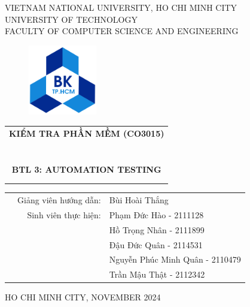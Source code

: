 \documentclass[a4paper, 12pt]{article}
\begin{document}
\begin{titlepage}
\begin{center}
VIETNAM NATIONAL UNIVERSITY, HO CHI MINH CITY \\
UNIVERSITY OF TECHNOLOGY \\
FACULTY OF COMPUTER SCIENCE AND ENGINEERING
\end{center}
\vspace{1cm}

\begin{figure}[h!]
\begin{center}
\includegraphics[width=3cm]{hcmut.png}
\end{center}
\end{figure}

\vspace{1cm}


\begin{center}
\begin{tabular}{c}
\multicolumn{1}{l}{\textbf{{\Large KIỂM TRA PHẦN MỀM (CO3015)}}}\\

~~\\
\hline
\\
\\
\textbf{{\Huge BTL 3: AUTOMATION TESTING}}\\
\\

\\
\hline
\end{tabular}
\end{center}

\vspace{3cm}

\begin{table}[h]
\begin{tabular}{rrl}
\hspace{3 cm} & Giảng viên hướng dẫn: & Bùi Hoài Thắng\\

& Sinh viên thực hiện:
& Phạm Đức Hào - 2111128\\
&& Hồ Trọng Nhân - 2111899\\
&& Đậu Đức Quân - 2114531\\
&& Nguyễn Phúc Minh Quân - 2110479\\
&& Trần Mậu Thật - 2112342
\end{tabular}
\end{table}

\begin{center}
{\footnotesize HO CHI MINH CITY, NOVEMBER 2024}
\end{center}
\end{titlepage}
\end{document}
